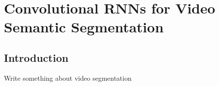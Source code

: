 \chapter{Convolutional RNNs for Video Semantic Segmentation}\label{sec:video_segmentation}

\section{Introduction}\label{sec:i}
Write something about video segmentation


